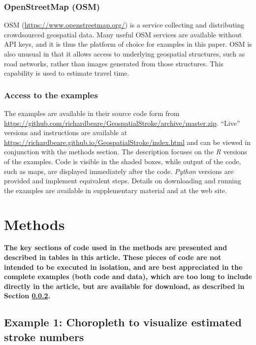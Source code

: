 \documentclass[utf8]{frontiersHLTH}
\begin{document}
\subsubsection{OpenStreetMap (OSM)}\label{openstreetmap-osm} 
OSM (\url{https://www.openstreetmap.org/}) is a service collecting and
distributing crowdsourced geospatial data. Many useful OSM services
are available without API keys, and it is thus the platform of choice
for examples in this paper. OSM is also unusual in that it allows
access to underlying geospatial structures, such as road networks, rather than
images generated from those structures. This capability is used to
estimate travel time.

\subsubsection{Access to the examples}\label{access-to-the-examples} 
The examples are available in their source code form from
\url{https://github.com/richardbeare/GeospatialStroke/archive/master.zip}. ``Live''
versions and instructions are available at
\url{https://richardbeare.github.io/GeospatialStroke/index.html}
and can be viewed in conjunction with the methods section. The
description focuses on the {\em R} versions of the examples. Code is
visible in the shaded boxes, while output of the code, such as maps,
are displayed immediately after the code. {\em Python} versions are
provided and implement equivalent steps. Details on downloading and
running the examples are available in supplementary material and at
the web site.

\section{Methods}\label{methods}
{\bf
The key sections of code used in the methods are presented and
described in tables in this article. These pieces of code are not
intended to be executed in isolation, and are best appreciated in the
complete examples (both code and data), which are too long to include
directly in the article, but are available for download, as described
in Section \ref{access-to-the-examples}.
}
\subsection{Example 1: Choropleth to visualize estimated stroke numbers}\label{example-1-choropleth-to-visualize-estimated-stroke-numbers} 
\end{document}

